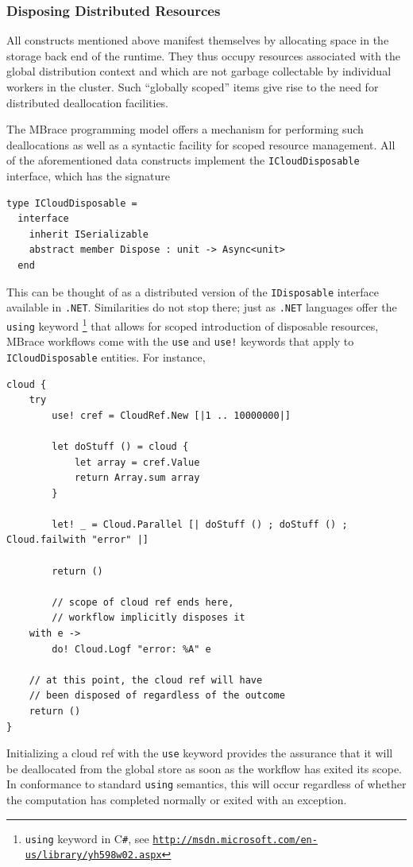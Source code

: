 \documentclass[9pt,a4paper]{article}
\newcommand{\mbrace}{MBrace}
\newcommand{\csharp}{C\texttt \#}
\newcommand{\dotnet}{\texttt{\hbox{.}NET}}
\newcommand{\samehref}[1]{\href{#1}{\texttt{#1}}}
\begin{document}
\subsubsection*{Disposing Distributed Resources}

All constructs mentioned above manifest themselves by allocating space in the
storage back end of the runtime. They thus occupy resources associated with
the global distribution context and which are not garbage collectable by
individual workers in the cluster. Such ``globally scoped'' items give rise
to the need for distributed deallocation facilities.

The \mbrace{} programming model offers a mechanism for performing such deallocations
as well as a syntactic facility for scoped resource management. 
All of the aforementioned data constructs implement the \texttt{ICloudDisposable}
interface, which has the signature
\begin{lstlisting}
type ICloudDisposable =
  interface
    inherit ISerializable
    abstract member Dispose : unit -> Async<unit>
  end
\end{lstlisting}
This can be thought of as a distributed version of the \texttt{IDisposable}
interface available in \dotnet. Similarities do not stop there; just as
\dotnet{} languages offer the \texttt{using} keyword%
\footnote{\texttt{using} keyword in \csharp, see 
\samehref{http://msdn.microsoft.com/en-us/library/yh598w02.aspx}} 
that allows for scoped introduction of disposable resources, 
\mbrace{} workflows come with the \texttt{use} and \texttt{use!} keywords that 
apply to \texttt{ICloudDisposable} entities. For instance,
\begin{lstlisting}
cloud {
	try
        use! cref = CloudRef.New [|1 .. 10000000|]

        let doStuff () = cloud {
            let array = cref.Value
            return Array.sum array
        }

        let! _ = Cloud.Parallel [| doStuff () ; doStuff () ; Cloud.failwith "error" |]

        return ()

		// scope of cloud ref ends here, 
		// workflow implicitly disposes it
	with e ->
		do! Cloud.Logf "error: %A" e
		
	// at this point, the cloud ref will have 
	// been disposed of regardless of the outcome
	return ()
}
\end{lstlisting}
Initializing a cloud ref with the \texttt{use} keyword provides the assurance 
that it will be deallocated from the global store as soon as the workflow has 
exited its scope. In conformance to standard \texttt{using} semantics,
this will occur regardless of whether the computation has completed normally
or exited with an exception.
\end{document}
